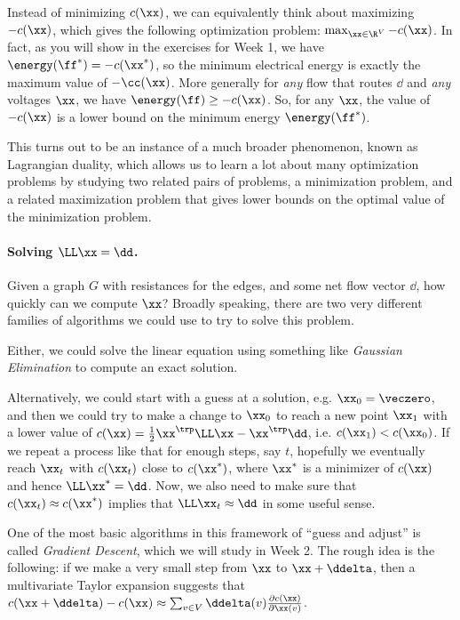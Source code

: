 Instead of minimizing $c(\xx)$, we can equivalently think about maximizing
$-c(\xx)$, which gives the following optimization problem: $\max_{\xx \in \R^V} -c(\xx)$.
In fact, as you will show in the exercises for Week 1,
we have $\energy(\ff^*) = -c(\xx^*)$, so the
minimum electrical energy is exactly the maximum value of
$-\cc(\xx)$.
More generally for \emph{any} flow that routes $\dd$ and \emph{any}
voltages $\xx$, we have $\energy(\ff) \geq -c(\xx)$.
So, for any $\xx$, the value of $-c(\xx)$ is a lower bound on the
minimum energy $\energy(\ff^*)$.

This turns out to be an instance of a much broader phenomenon, known
as Lagrangian duality, which allows us to learn a lot about many
optimization problems by studying two related pairs of problems, a
minimization problem, and a related maximization problem that gives
lower bounds on the optimal value of the minimization problem.

\paragraph{Solving $\LL \xx = \dd$.}
Given a graph $G$ with resistances for the edges, and some net flow
vector $\dd$, how quickly can we compute $\xx$?
%
Broadly speaking, there are two very different families of algorithms
we could use to try to solve this problem.

Either, we could solve the linear equation using something like
\emph{Gaussian Elimination} to compute an exact solution.

Alternatively,
we could start with a guess at a solution, e.g. $\xx_0
= \veczero$, and then we could try to make a change to $\xx_0$ to reach
a new point $\xx_1$ with a lower value of $c(\xx) = \frac{1}{2} \xx^{\trp} \LL \xx -
\xx^{\trp}\dd$, i.e. $c(\xx_1) < c(\xx_0)$.
If we repeat a process like that for enough steps, say $t$, hopefully we
eventually reach $\xx_t$ with $c(\xx_t)$ close to $c(\xx^*)$, where
$\xx^*$ is a minimizer of $c(\xx)$ and hence $\LL \xx^* = \dd$.
Now, we also need to make sure that $c(\xx_t) \approx c(\xx^*)$
implies that $\LL \xx_t \approx \dd$ in some useful sense.

One of the most basic algorithms in this framework of ``guess and adjust''
is called \emph{Gradient Descent}, which we will study in Week 2.
The rough idea is the following: if we make a very small step from $\xx$ to
$\xx + \ddelta$, then a multivariate Taylor expansion suggests that
$c(\xx + \ddelta) - c(\xx) \approx \sum_{v \in V} \ddelta(v)
\frac{\partial c(\xx)}{\partial\xx(v)} $.

